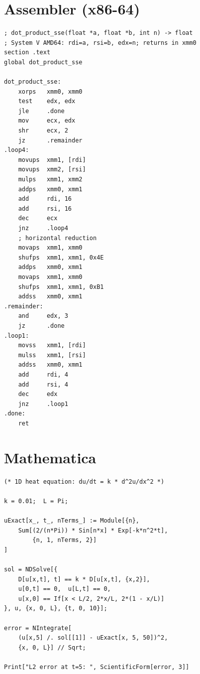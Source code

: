 \section{Assembler (x86-64)}

\begin{lstlisting}[style=asm, caption={Producto punto con SSE}]
; dot_product_sse(float *a, float *b, int n) -> float
; System V AMD64: rdi=a, rsi=b, edx=n; returns in xmm0
section .text
global dot_product_sse

dot_product_sse:
    xorps   xmm0, xmm0
    test    edx, edx
    jle     .done
    mov     ecx, edx
    shr     ecx, 2
    jz      .remainder
.loop4:
    movups  xmm1, [rdi]
    movups  xmm2, [rsi]
    mulps   xmm1, xmm2
    addps   xmm0, xmm1
    add     rdi, 16
    add     rsi, 16
    dec     ecx
    jnz     .loop4
    ; horizontal reduction
    movaps  xmm1, xmm0
    shufps  xmm1, xmm1, 0x4E
    addps   xmm0, xmm1
    movaps  xmm1, xmm0
    shufps  xmm1, xmm1, 0xB1
    addss   xmm0, xmm1
.remainder:
    and     edx, 3
    jz      .done
.loop1:
    movss   xmm1, [rdi]
    mulss   xmm1, [rsi]
    addss   xmm0, xmm1
    add     rdi, 4
    add     rsi, 4
    dec     edx
    jnz     .loop1
.done:
    ret
\end{lstlisting}

\section{Mathematica}

\begin{lstlisting}[style=mathematica, caption={EDP de calor: simbólica + numérica}]
(* 1D heat equation: du/dt = k * d^2u/dx^2 *)

k = 0.01;  L = Pi;

uExact[x_, t_, nTerms_] := Module[{n},
    Sum[(2/(n*Pi)) * Sin[n*x] * Exp[-k*n^2*t],
        {n, 1, nTerms, 2}]
]

sol = NDSolve[{
    D[u[x,t], t] == k * D[u[x,t], {x,2}],
    u[0,t] == 0,  u[L,t] == 0,
    u[x,0] == If[x < L/2, 2*x/L, 2*(1 - x/L)]
}, u, {x, 0, L}, {t, 0, 10}];

error = NIntegrate[
    (u[x,5] /. sol[[1]] - uExact[x, 5, 50])^2,
    {x, 0, L}] // Sqrt;

Print["L2 error at t=5: ", ScientificForm[error, 3]]
\end{lstlisting}


